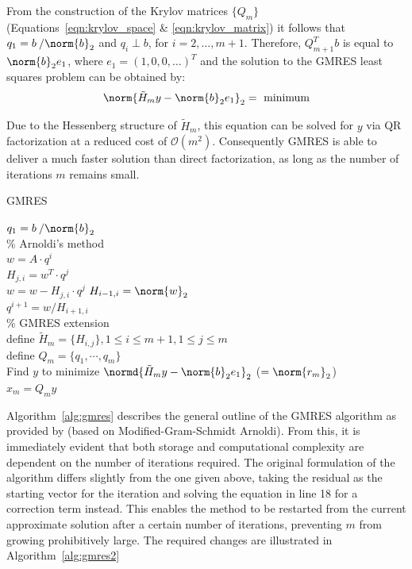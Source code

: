 \noindent From the construction of the Krylov matrices $\{Q_m\}$ (Equations~\hyperref[eqn:krylov_space]{\ref{eqn:krylov_space}} \& \hyperref[eqn:krylov_matrix]{\ref{eqn:krylov_matrix}}) it follows that $q_1=b\:/\norm{b}_2$ and $q_i \perp b$, for $i = 2, \dots, m+1$. Therefore, $Q^T_{m+1}b$ is equal to $\norm{b}_2e_1$, where $e_1=(1,0,0,\dots)^T$ and the solution to the GMRES least squares problem can be obtained by:
\begin{equation}
    \norm{\tilde{H}_my-\norm{b}_2e_1}_2 = \text{ minimum}
\end{equation}

\noindent Due to the Hessenberg structure of $\tilde{H}_m$, this equation can be solved for $y$ via QR factorization at a reduced cost of $\mathcal{O}(m^2)$. Consequently GMRES is able to deliver a much faster solution than direct factorization, as long as the number of iterations $m$ remains small.

\begin{algorithm}[h]
  \caption{GMRES}
  \label{alg:gmres}
  \SetAlgoLined
  \DontPrintSemicolon
  $q_1= b\:/\norm{b}_2$ \\
  \% Arnoldi's method \\
   {
    $w =A\cdot q^i$ \\
     {
      $H_{j,i} = w^T\cdot q^j$ \\
      $ w = w - H_{j,i}\cdot q^j$}
    $H_{i-1,i} = \norm{w}_2$ \\
    $q^{i+1} = w/H_{i+1,i}$ \\
  }
  \;
  \% GMRES extension \\
  define $\tilde{H}_m = \{H_{i,j}\}, 1 \leq i \leq m+1, 1 \leq j \leq m$ \\
  define $Q_m = \{q_1, \cdots, q_m\}$ \\
  Find $y$ to minimize $\normd{\tilde{H}_my-\norm{b}_2e_1}_2$ ($=\norm{r_m}_2$) \\
  $x_m = Q_my$
\end{algorithm}

\noindent Algorithm~\hyperref[alg:gmres]{\ref{alg:gmres}} describes the general outline of the GMRES algorithm as provided by \cite{trefethen_numerical_1997} (based on Modified-Gram-Schmidt Arnoldi). From this, it is immediately evident that both storage and computational complexity are dependent on the number of iterations required. The original formulation of the algorithm \cite{saad_gmres_1986} differs slightly from the one given above, taking the residual as the starting vector for the iteration and solving the equation in line 18 for a correction term instead. This enables the method to be restarted from the current approximate solution after a certain number of iterations, preventing $m$ from growing prohibitively large. The required changes are illustrated in Algorithm~\hyperref[alg:gmres2]{\ref{alg:gmres2}}

